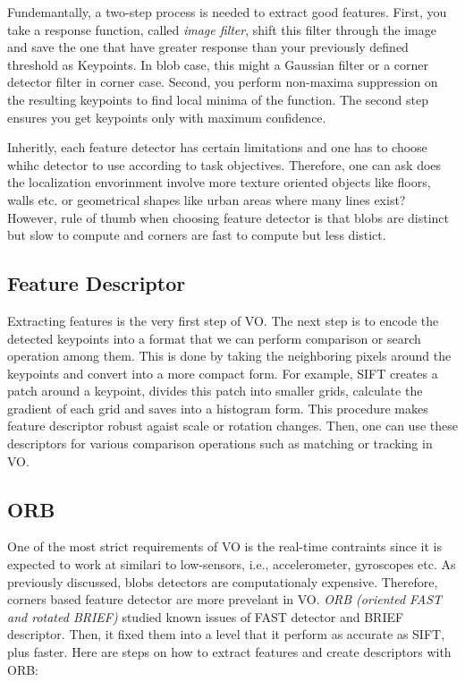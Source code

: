 \documentclass[a4paper]{report}
\numberwithin{figure}{section}
\begin{document}
Fundemantally, a two-step process is needed to extract good features. 
First, you take a response function, called \textit{image filter}, 
shift this filter through the image and save the one that have greater 
response than your previously defined threshold as Keypoints.
In blob case, this might a Gaussian filter or a 
corner detector filter in corner case. Second, you perform non-maxima 
suppression on the resulting keypoints to find local minima of the function. 
The second step ensures you get keypoints only with maximum confidence. 

Inheritly, each feature detector has certain limitations and one has to 
choose whihc detector to use according to task objectives. Therefore, one can ask 
does the localization envorinment involve more texture oriented objects like 
floors, walls etc. or geometrical shapes like urban areas where many lines 
exist?
However, rule of thumb when choosing feature detector is that blobs 
are distinct but slow to compute and corners are fast to compute but less 
distict. 

\subsection{Feature Descriptor} \label{sb_sc_feature_descriptor}

Extracting features is the very first step of VO. The next step is to 
encode the detected keypoints into a format that we can perform comparison 
or search operation among them. This is done by taking the neighboring pixels 
around the keypoints and convert into a more compact form. For example, SIFT 
creates a patch around a keypoint, divides this patch into smaller grids,
calculate the gradient of each grid and 
saves into a histogram form.
This procedure makes feature descriptor 
robust agaist scale or rotation changes. Then, one can use these descriptors for 
various comparison operations such as matching or tracking in VO.


\subsection{ORB} \label{sb_sc_orb}

One of the most strict requirements of VO is the real-time contraints since it is 
expected to work at similari to low-sensors, i.e., accelerometer, gyroscopes etc. 
As previously discussed, blobs detectors are computationaly expensive. Therefore, 
corners based feature detector are more prevelant in VO. 
\textit{ORB (oriented FAST and rotated BRIEF)} studied known issues of 
FAST detector and BRIEF descriptor. Then, it fixed them into a level that 
it perform as accurate as SIFT, plus faster. Here are steps on how to extract features 
and create descriptors with ORB: 
\end{document}
